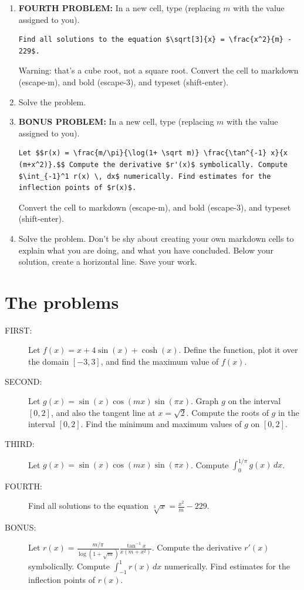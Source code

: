 \documentclass[12pt,answers]{book}
\begin{document}
\begin{enumerate}
  \item {\bf FOURTH PROBLEM:}  In a new cell, type (replacing $m$ with the value assigned to you).
  \begin{lstlisting}[breaklines]
    Find all solutions to the equation $\sqrt[3]{x} = \frac{x^2}{m} - 229$.
  \end{lstlisting}
  Warning: that's a cube root, not a square root. Convert the cell to markdown (escape-m), and bold (escape-3), and typeset (shift-enter).

  \item Solve the problem.

  \item {\bf BONUS PROBLEM:} In a new cell, type (replacing $m$ with the value assigned to you).
  \begin{lstlisting}[breaklines]
    Let $$r(x) = \frac{m/\pi}{\log(1+ \sqrt m)} \frac{\tan^{-1} x}{x (m+x^2)}.$$ Compute the derivative $r'(x)$ symbolically. Compute $\int_{-1}^1 r(x) \, dx$ numerically. Find estimates for the inflection points of $r(x)$.
  \end{lstlisting}
  Convert the cell to markdown (escape-m), and bold (escape-3), and typeset (shift-enter).
  \item Solve the problem. Don't be shy about creating your own markdown cells to explain what you are doing, and what you have concluded. Below your solution, create a horizontal line. Save your work.

\end{enumerate}

\section{The problems}
\begin{description}
  \item[FIRST:] Let $f(x) = x+4\sin(x)+\cosh(x)$. Define the function, plot it over the domain $[-3,3]$, and find the maximum value of $f(x)$.
  \item[SECOND:] Let $\displaystyle g(x) = \sin(x)\cos(m x)\sin(\pi x).$ Graph $g$ on the interval $[0,2]$, and also the tangent line at $x=\sqrt{2}$. Compute the roots of $g$ in the interval $[0,2]$. Find the minimum and maximum values of $g$ on $[0,2]$.
  \item[THIRD:] Let $g(x) = \sin(x)\cos(m x)\sin(\pi x)$. Compute $\int_0^{1/\pi} g(x)\,dx$.
  \item[FOURTH:] Find all solutions to the equation $\sqrt[3]{x} = \frac{x^2}{m} - 229$.
  \item[BONUS:] Let $\displaystyle r(x) = \frac{m/\pi}{\log(1+ \sqrt m)} \frac{\tan^{-1} x}{x (m+x^2)}.$ Compute the derivative $r'(x)$ symbolically. Compute $\int_{-1}^1 r(x) \, dx$ numerically. Find estimates for the inflection points of $r(x)$.
\end{description}
\end{document}
